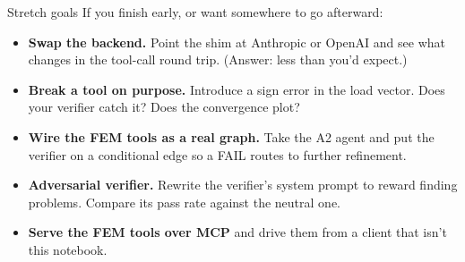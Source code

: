 \documentclass[aspectratio=169,10pt]{beamer}
\begin{document}
\begin{frame}{Stretch goals}
If you finish early, or want somewhere to go afterward:

\vspace{0.8em}
\begin{itemize}\itemsep5pt
  \item \textbf{Swap the backend.} Point the shim at Anthropic or OpenAI and see
        what changes in the tool-call round trip. (Answer: less than you'd expect.)
  \item \textbf{Break a tool on purpose.} Introduce a sign error in the load
        vector. Does your verifier catch it? Does the convergence plot?
  \item \textbf{Wire the FEM tools as a real graph.} Take the A2 agent and put
        the verifier on a conditional edge so a FAIL routes to further refinement.
  \item \textbf{Adversarial verifier.} Rewrite the verifier's system prompt to
        reward finding problems. Compare its pass rate against the neutral one.
  \item \textbf{Serve the FEM tools over MCP} and drive them from a client that
        isn't this notebook.
\end{itemize}
\end{frame}
\end{document}
